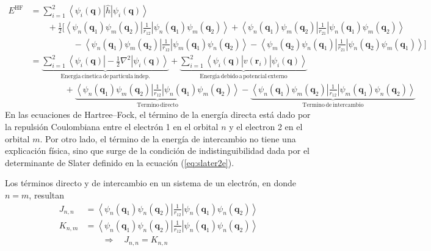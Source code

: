 \documentclass[10pt]{article}
\begin{document}
\begin{align}
 E^{\mathrm{HF}}
 &=\sum_{i=1}^2 \left< \psi_i(\mathbf{q})\right|\hat{h}\left| \psi_i(\mathbf{q})\right> 
 \\ &\qquad
+\frac{1}{2}\bigg[
\left<\psi_n(\mathbf{q}_1)\psi_m(\mathbf{q}_2)
\right|\frac{1}{r_{12}} \left|
\psi_n(\mathbf{q}_1)\psi_m(\mathbf{q}_2) \right> 
+\left<\psi_n(\mathbf{q}_1)\psi_m(\mathbf{q}_2)
\right|\frac{1}{r_{21}} \left|
 \psi_n(\mathbf{q}_1)\psi_m(\mathbf{q}_2)\right>
 \\ &\qquad\qquad\quad
-\left<\psi_n(\mathbf{q}_1)\psi_m(\mathbf{q}_2)\right|\frac{1}{r_{12}}\left|
\psi_m(\mathbf{q}_1)\psi_n(\mathbf{q}_2)\right>
-\left<\psi_m(\mathbf{q}_2)\psi_n(\mathbf{q}_1)\right|\frac{1}{r_{21}}\left|
\psi_n(\mathbf{q}_2)\psi_m(\mathbf{q}_1)\right>\bigg] \\
 &=\underbrace{\sum_{i=1}^2 \left< \psi_i(\mathbf{q})\right|
 -\frac{1}{2}\nabla^2 \left| \psi_i(\mathbf{q})\right>}_{
 \mathrm{Energia\,cinetica\,de\,particula\,indep.}}
 +\underbrace{\sum_{i=1}^2 \left< \psi_i(\mathbf{q})\right| 
 v(\mathbf{r}_i) \left| \psi_i(\mathbf{q})\right>}_{\mathrm{Energia\,debido\,a\,potencial\,externo}} \\
 &\qquad\qquad
+\underbrace{\left<\psi_n(\mathbf{q}_1)\psi_m(\mathbf{q}_2)
\right|\frac{1}{r_{12}} \left|
\psi_n(\mathbf{q}_1)\psi_m(\mathbf{q}_2) \right> }_{\mathrm{
Termino\,directo}}
-\underbrace{\left<\psi_n(\mathbf{q}_1)\psi_m(\mathbf{q}_2)\right|\frac{1}{r_{12}}\left|
\psi_m(\mathbf{q}_1)\psi_n(\mathbf{q}_2)\right>}_{\mathrm{Termino\,de\,intercambio}}
\end{align}
En las ecuaciones de Hartree--Fock, el término de la energía directa está dado por la repulsión Coulombiana entre el electrón 1
en el orbital $n$ y el electron 2 en el orbital $m$. Por otro lado,
el término de la energía de intercambio no tiene una explicación
física, sino que surge de la condición de indistinguibilidad dada
por el determinante de Slater definido en la ecuación 
(\ref{eq:slater2e}). 

\vspace{0.5cm}
Los términos directo y de intercambio en un sistema de un electrón,
en donde $n=m$, resultan
\begin{align}
J_{n,n}&= \left<\psi_n(\mathbf{q}_1)\psi_n(\mathbf{q}_2)
\right|\frac{1}{r_{12}} \left|
\psi_n(\mathbf{q}_1)\psi_n(\mathbf{q}_2) \right> \\
K_{n,m}&=\left<\psi_n(\mathbf{q}_1)\psi_n(\mathbf{q}_2)\right|\frac{1}{r_{12}}\left|
\psi_n(\mathbf{q}_1)\psi_n(\mathbf{q}_2)\right> \\
&\qquad \Rightarrow \quad J_{n,n}=K_{n,n}
\end{align}
\end{document}
